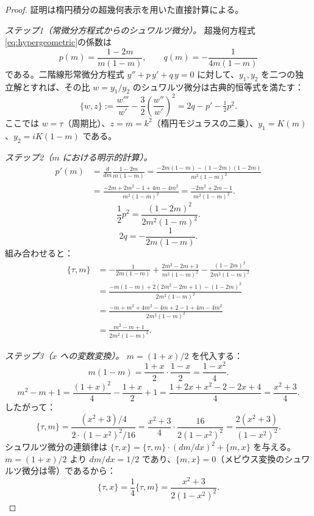 \documentclass[12pt]{article}
\theoremstyle{plain}
\theoremstyle{definition}
\numberwithin{equation}{section}
\begin{document}
\begin{proof}
証明は楕円積分の超幾何表示を用いた直接計算による。

\emph{ステップ1（常微分方程式からのシュワルツ微分）。}
超幾何方程式\eqref{eq:hypergeometric}の係数は
\begin{equation}
p(m)=\frac{1-2m}{m(1-m)},\qquad q(m)=-\frac{1}{4m(1-m)}
\end{equation}
である。二階線形常微分方程式 $y''+p\,y'+q\,y=0$ に対して、$y_1,y_2$ を二つの独立解とすれば、その比 $w=y_1/y_2$ のシュワルツ微分は古典的恒等式を満たす：
\begin{equation}
\{w,z\} := \frac{w'''}{w'}-\frac{3}{2}\left(\frac{w''}{w'}\right)^2 = 2q-p'-\tfrac{1}{2}p^2.
\end{equation}
ここでは $w=\tau$（周期比）、$z=m=k^2$（楕円モジュラスの二乗）、$y_1=K(m)$、$y_2=iK(1-m)$ である。

\emph{ステップ2（$m$ における明示的計算）。}
\begin{align}
p'(m) &= \frac{d}{dm}\frac{1-2m}{m(1-m)} = \frac{-2m(1-m)-(1-2m)(1-2m)}{m^2(1-m)^2}\\
&= \frac{-2m+2m^2-1+4m-4m^2}{m^2(1-m)^2} = \frac{-2m^2+2m-1}{m^2(1-m)^2}.
\end{align}
\begin{equation}
\frac{1}{2}p^2 = \frac{(1-2m)^2}{2m^2(1-m)^2}.
\end{equation}
\begin{equation}
2q = -\frac{1}{2m(1-m)}.
\end{equation}
組み合わせると：
\begin{align}
\{\tau,m\} &= -\frac{1}{2m(1-m)}+\frac{2m^2-2m+1}{m^2(1-m)^2}-\frac{(1-2m)^2}{2m^2(1-m)^2}\\
&= \frac{-m(1-m)+2(2m^2-2m+1)-(1-2m)^2}{2m^2(1-m)^2}\\
&= \frac{-m+m^2+4m^2-4m+2-1+4m-4m^2}{2m^2(1-m)^2}\\
&= \frac{m^2-m+1}{2m^2(1-m)^2}.
\end{align}

\emph{ステップ3（$x$ への変数変換）。}
$m=(1+x)/2$ を代入する：
\begin{equation}
m(1-m) = \frac{1+x}{2}\cdot\frac{1-x}{2} = \frac{1-x^2}{4}.
\end{equation}
\begin{equation}
m^2-m+1 = \frac{(1+x)^2}{4}-\frac{1+x}{2}+1 = \frac{1+2x+x^2-2-2x+4}{4} = \frac{x^2+3}{4}.
\end{equation}
したがって：
\begin{equation}
\{\tau,m\} = \frac{(x^2+3)/4}{2\cdot(1-x^2)^2/16} = \frac{x^2+3}{4}\cdot\frac{16}{2(1-x^2)^2} = \frac{2(x^2+3)}{(1-x^2)^2}.
\end{equation}
シュワルツ微分の連鎖律は $\{\tau,x\}=\{\tau,m\}\cdot(dm/dx)^2+\{m,x\}$ を与える。$m=(1+x)/2$ より $dm/dx=1/2$ であり、$\{m,x\}=0$（メビウス変換のシュワルツ微分は零）であるから：
\begin{equation}
\{\tau,x\} = \frac{1}{4}\{\tau,m\} = \frac{x^2+3}{2(1-x^2)^2}.
\end{equation}


\end{proof}
\end{document}

